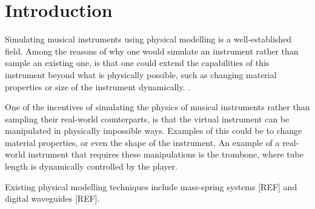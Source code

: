 \section{Introduction}

Simulating musical instruments using physical modelling is a well-established field. Among the reasons of why one would simulate an instrument rather than sample an existing one, is that one could extend the capabilities of this instrument beyond what is physically possible, such as changing material properties or size of the instrument dynamically. .



One of the incentives of simulating the physics of musical instruments rather than sampling their real-world counterparts, is that the virtual instrument can be manipulated in physically impossible ways.  \SWcomment[Will do!] Examples of this could be to change material properties, or even the shape of the instrument. An example of a real-world instrument that requires these manipulations is the trombone, where tube length is dynamically controlled by the player.


Existing physical modelling techniques include mass-spring systems [REF] and digital waveguides [REF]. 



